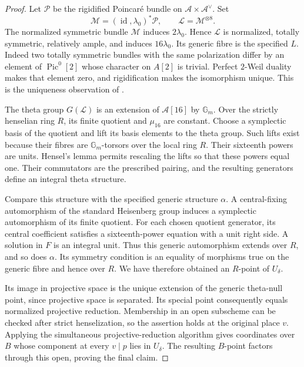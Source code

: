\documentclass[11pt]{article}
\theoremstyle{definition}
\theoremstyle{remark}
\begin{document}
\begin{proof}
Let \(\mathcal P\) be the rigidified Poincar\'e bundle on
\(\mathcal A\times\mathcal A^\vee\).  Set
\[
 \mathcal M=(\operatorname{id},\lambda_0)^*\mathcal P,
 \qquad \mathcal L=\mathcal M^{\otimes8}.
\]
The normalized symmetric bundle \(\mathcal M\) induces
\(2\lambda_0\).  Hence \(\mathcal L\) is normalized, totally
symmetric, relatively ample, and induces \(16\lambda_0\).
Its generic fibre is the specified \(L\).  Indeed two totally
symmetric bundles with the same polarization differ by an
element of \(\operatorname{Pic}^0[2]\) whose character on
\(A[2]\) is trivial.  Perfect \(2\)-Weil duality makes that
element zero, and rigidification makes the isomorphism unique.
This is the uniqueness observation of
\citet[Section~2, pp.~304--305 and 307]{Mumford1966}.

The theta group \(G(\mathcal L)\) is an extension of
\(\mathcal A[16]\) by \(\mathbb G_m\).  Over the strictly
henselian ring \(R\), its finite quotient and \(\mu_{16}\)
are constant.  Choose a symplectic basis of the quotient and
lift its basis elements to the theta group.  Such lifts exist
because their fibres are \(\mathbb G_m\)-torsors over the local
ring \(R\).  Their sixteenth powers are units.  Hensel's lemma
permits rescaling the lifts so that these powers equal one.
Their commutators are the prescribed pairing, and the resulting
generators define an integral theta structure.

Compare this structure with the specified generic structure
\(\alpha\).  A central-fixing automorphism of the standard
Heisenberg group induces a symplectic automorphism of its finite
quotient.  For each chosen quotient generator, its central
coefficient satisfies a sixteenth-power equation with a unit
right side.  A solution in \(F\) is an integral unit.  Thus
this generic automorphism extends over \(R\), and so does
\(\alpha\).  Its symmetry condition is an equality of
morphisms true on the generic fibre and hence over \(R\).
We have therefore obtained an \(R\)-point of \(U_\delta\).

Its image in projective space is the unique extension of the
generic theta-null point, since projective space is separated.
Its special point consequently equals normalized projective
reduction.  Membership in an open subscheme can be checked after
strict henselization, so the assertion holds at the original
place \(v\).  Applying the simultaneous projective-reduction
algorithm gives coordinates over \(B\) whose component at every
\(v\mid p\) lies in \(U_\delta\).  The resulting
\(B\)-point factors through this open, proving the final claim.
\end{proof}
\end{document}
